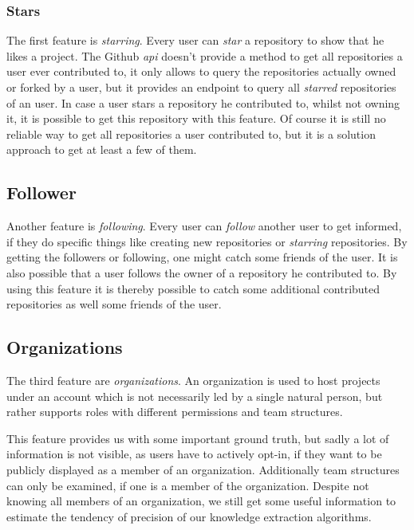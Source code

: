 \subsubsection{Stars}
The first feature is \emph{starring}. Every user can \emph{star} a repository to show that he likes a project.
The Github \emph{api} doesn't provide a method to get all repositories a user ever contributed to, it only allows to query the repositories actually owned or forked by a user, but it provides an endpoint to query all \emph{starred} repositories of an user.
In case a user stars a repository he contributed to, whilst not owning it, it is possible to get this repository with this feature.
Of course it is still no reliable way to get all repositories a user contributed to, but it is a solution approach to get at least a few of them.

\subsection{Follower}
Another feature is \emph{following}. Every user can \emph{follow} another user to get informed, if they do specific things like creating new repositories or \emph{starring} repositories.
By getting the followers or following, one might catch some friends of the user.
It is also possible that a user follows the owner of a repository he contributed to.
By using this feature it is thereby possible to catch some additional contributed repositories as well some friends of the user.

\subsection{Organizations}
The third feature are \emph{organizations}.
An organization is used to host projects under an account which is not necessarily led by a single natural person, but rather supports roles with different permissions and team structures.

This feature provides us with some important ground truth, but sadly a lot of information is not visible, as users have to actively opt-in, if they want to be publicly displayed as a member of an organization.
Additionally team structures can only be examined, if one is a member of the organization.
Despite not knowing all members of an organization, we still get some useful information to estimate the tendency of precision of our knowledge extraction algorithms.
